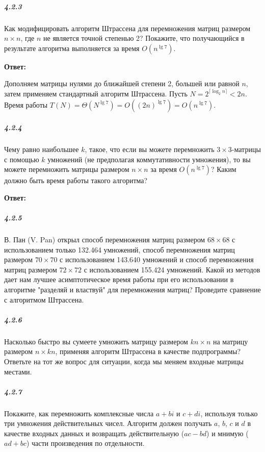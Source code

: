 \subparagraph{4.2.3}
Как модифицировать алгоритм Штрассена для перемножения матриц размером \(n \times n\),
где \(n\) не является точной степенью 2? Покажите, что получающийся в результате алгоритма
выполняется за время \(O(n^{\lg 7})\).

\textbf{Ответ:}

Дополняем матрицы нулями до ближайшей степени 2, большей или равной \(n\), 
затем применяем стандартный алгоритм Штрассена. 
Пусть \(N = 2^{\lceil \log_2 n \rceil} < 2n\). 
Время работы \(T(N) = \Theta(N^{\lg 7}) = O((2n)^{\lg 7}) = O(n^{\lg 7})\).


\subparagraph{4.2.4}
Чему равно наибольшее \(k\), такое, что если вы можете перемножить \(3 \times 3\)-матрицы с
помощью \(k\) умножений (не предполагая коммутативности умножения), 
то вы можете перемножить матрицы размером \(n \times n\) за время \(O(n^{\lg 7})\)? 
Каким должно быть время работы такого алгоритма?

\textbf{Ответ:}



\subparagraph{4.2.5}
В. Пан (V. Pan) открыл способ перемножения матриц размером \(68 \times 68\) с использованием только 132.464 умножений, 
способ перемножения матриц размером \(70 \times 70\) с использованием 143.640 умножений 
и способ перемножения матриц размером \(72 \times 72\) с использованием 155.424 умножений. 
Какой из методов дает нам лучшее асимптотическое время работы при его использовании в алгоритме 
"разделяй и властвуй" для перемножения матриц? Проведите сравнение с алгоритмом Штрассена.

\subparagraph{4.2.6}
Насколько быстро вы сумеете умножить матрицу размером \(kn \times n\) на матрицу размером \(n \times kn\), применяя алгоритм Штрассена в качестве подпрограммы? Ответьте на тот же вопрос для ситуации, когда мы меняем входные матрицы местами.

\subparagraph{4.2.7}
Покажите, как перемножить комплексные числа \(a + bi\) и \(c + di\), 
используя только три умножения действительных чисел. 
Алгоритм должен получать \(a\), \(b\), \(c\) и \(d\) 
в качестве входных данных и возвращать действительную (\(ac - bd\)) 
и мнимую (\(ad + bc\)) части произведения по отдельности.